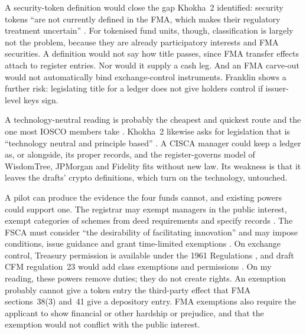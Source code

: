 \documentclass[12pt,a4paper]{article}
\begin{document}
A security-token definition would close the gap Khokha~2 identified: security tokens ``are not currently defined in the FMA, which makes their regulatory treatment uncertain'' \citep[p.~43]{SARB2022Khokha2}. For tokenised fund units, though, classification is largely not the problem, because they are already participatory interests and FMA securities. A definition would not say how title passes, since FMA transfer effects attach to register entries. Nor would it supply a cash leg. And an FMA carve-out would not automatically bind exchange-control instruments. Franklin shows a further risk: legislating title for a ledger does not give holders control if issuer-level keys sign.

A technology-neutral reading is probably the cheapest and quickest route and the one most IOSCO members take \citep[p.~62]{IOSCO2025}. Khokha~2 likewise asks for legislation that is ``technology neutral and principle based'' \citep[p.~44]{SARB2022Khokha2}. A CISCA manager could keep a ledger as, or alongside, its proper records, and the register-governs model of WisdomTree, JPMorgan and Fidelity fits without new law. Its weakness is that it leaves the drafts' crypto definitions, which turn on the technology, untouched.

A pilot can produce the evidence the four funds cannot, and existing powers could support one. The registrar may exempt managers in the public interest, exempt categories of schemes from deed requirements and specify records \citep[ss~22, 97(2), 114(3)(a), pp.~11, 35, 43]{CISCA2002}. The FSCA must consider ``the desirability of facilitating innovation'' and may impose conditions, issue guidance and grant time-limited exemptions \citep[s~6(3)(b)(iii), (h), (k), (m), pp.~17--18]{FMA2012}. On exchange control, Treasury permission is available under the 1961 Regulations \citep[reg~14(1), p.~16]{ExConRegs1961}, and draft CFM regulation~23 would add class exemptions and permissions \citep[reg~23(1)--(2), p.~23]{NT2026CFMDraft}. On my reading, these powers remove duties; they do not create rights. An exemption probably cannot give a token entry the third-party effect that FMA sections~38(3) and~41 give a depository entry. FMA exemptions also require the applicant to show financial or other hardship or prejudice, and that the exemption would not conflict with the public interest.
\end{document}
